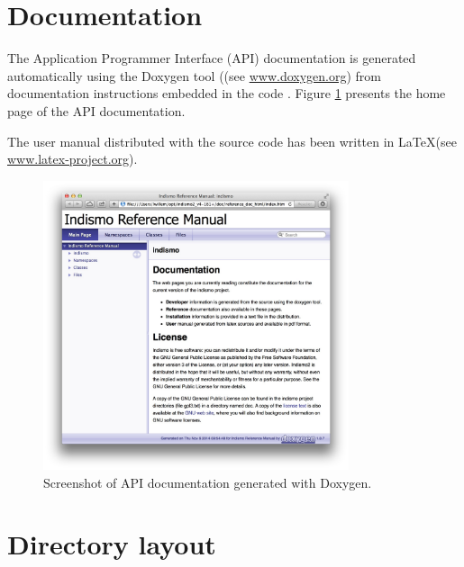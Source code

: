 %
\section{Documentation}
\label{section:documentation}

The Application Programmer Interface (API) documentation is generated automatically 
using the Doxygen tool ((see \url{www.doxygen.org}) from documentation instructions 
embedded in the code . Figure \ref{fig:doxygenapi} presents the home page of the API 
documentation.

The user manual distributed with the source code has been written in \LaTeX (see \url{www.latex-project.org}).

\begin{figure}[h]
	\begin{center}
		\includegraphics[width=0.8\textwidth]{images/screen_shot_doxygen_API.pdf}  
	\end{center}
	\caption{Screenshot of API documentation generated with Doxygen.}
	\label{fig:doxygenapi}
\end{figure}


%
\section{Directory layout}

